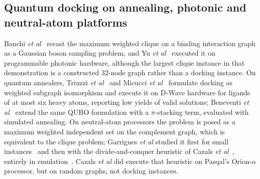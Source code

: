\documentclass{iopjournal}
\begin{document}
\subsection{Quantum docking on annealing, photonic and neutral-atom platforms}
\label{sec:rel-other}
Banchi \textit{et al}~\cite{banchi2020gbs} recast the maximum weighted clique on a binding interaction graph as a Gaussian boson sampling problem, and Yu \textit{et al}~\cite{yu2023gbs} executed it on programmable photonic hardware, although the largest clique instance in that demonstration is a constructed 32-node graph rather than a docking instance. On quantum annealers, Triuzzi \textit{et al}~\cite{triuzzi2025weighted} and Micucci \textit{et al}~\cite{micucci2026subgraph} formulate docking as weighted subgraph isomorphism and execute it on D-Wave hardware for ligands of at most six heavy atoms, reporting low yields of valid solutions; Beneventi \textit{et al}~\cite{beneventi2026pistacking} extend the same QUBO formulation with a $\pi$-stacking term, evaluated with simulated annealing. On neutral-atom processors the problem is posed as a maximum weighted independent set on the complement graph, which is equivalent to the clique problem; Garrigues \textit{et al} studied it first for small instances~\cite{garrigues2024towards} and then with the divide-and-conquer heuristic of Cazals \textit{et al}~\cite{cazals2025rydberg}, entirely in emulation~\cite{garrigues2026scalable}. Cazals \textit{et al} did execute that heuristic on Pasqal's Orion-$\alpha$ processor, but on random graphs, not docking instances.
\end{document}
